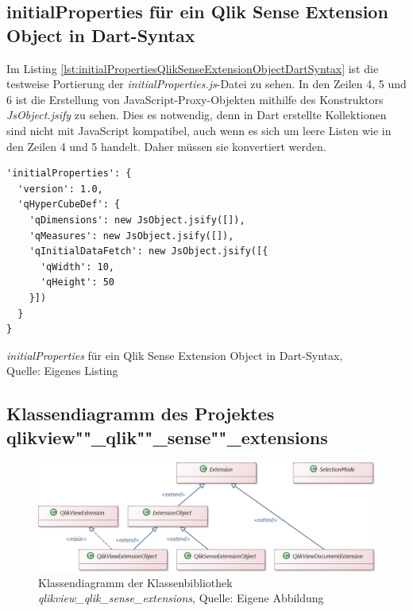 \begin{appendix}
\newpage
\subsection{initialProperties für ein Qlik Sense Extension Object in Dart-Syntax} 
\label{lab:initialPropertiesQlikSenseExtensionObjectDartSyntax} 

Im Listing \ref{lst:initialPropertiesQlikSenseExtensionObjectDartSyntax} ist die testweise Portierung der \textit{initialProperties.js}-Datei zu sehen. In den Zeilen 4, 5 und 6 ist die Erstellung von JavaScript-Proxy-Objekten mithilfe des Konstruktors \textit{JsObject.jsify} zu sehen. Dies es notwendig, denn in Dart erstellte Kollektionen sind nicht mit JavaScript kompatibel, auch wenn es sich um leere Listen wie in den Zeilen 4 und 5 handelt. Daher müssen sie konvertiert werden.

\ifIncludeFigures\begin{listing}[htbp]
\begin{verbatim}
'initialProperties': {
  'version': 1.0,
  'qHyperCubeDef': {
    'qDimensions': new JsObject.jsify([]),
    'qMeasures': new JsObject.jsify([]),
    'qInitialDataFetch': new JsObject.jsify([{
      'qWidth': 10,
      'qHeight': 50
    }])
  }
}
\end{verbatim}
\caption[\textit{initialProperties} für ein Qlik Sense Extension Object in Dart-Syntax]{\textit{initialProperties} für ein Qlik Sense Extension Object in Dart-Syntax, \\Quelle: Eigenes Listing}
\label{lst:initialPropertiesQlikSenseExtensionObjectDartSyntax}
\end{listing}\fi


\newpage
\subsection{Klassendiagramm des Projektes qlikview""\_qlik""\_sense""\_extensions} 
\label{lab:KlassendiagrammDerKlassenbibliothek} 

\ifIncludeFigures\begin{figure}[htbp]
	\centering
		\includegraphics[width=1.00\textwidth]{img/Klassendiagramm/Klassendiagramm.png}
	\caption[Klassendiagramm der Klassenbibliothek \textit{qlikview\_qlik\_sense\_extensions}]{Klassendiagramm der Klassenbibliothek \textit{qlikview\_qlik\_sense\_extensions}, Quelle: Eigene Abbildung}
	\label{fig:Klassendiagramm}
\end{figure}\fi



\end{appendix}
